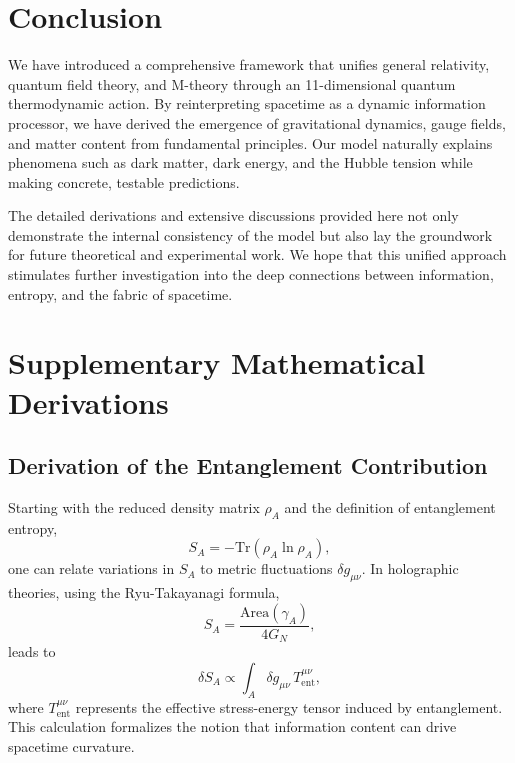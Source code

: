 \documentclass[12pt, a4paper]{article}
\begin{document}
\section{Conclusion}
We have introduced a comprehensive framework that unifies general relativity, quantum field theory, and M-theory through an 11-dimensional quantum thermodynamic action. By reinterpreting spacetime as a dynamic information processor, we have derived the emergence of gravitational dynamics, gauge fields, and matter content from fundamental principles. Our model naturally explains phenomena such as dark matter, dark energy, and the Hubble tension while making concrete, testable predictions.

The detailed derivations and extensive discussions provided here not only demonstrate the internal consistency of the model but also lay the groundwork for future theoretical and experimental work. We hope that this unified approach stimulates further investigation into the deep connections between information, entropy, and the fabric of spacetime.

\appendix

\section{Supplementary Mathematical Derivations}
\subsection{Derivation of the Entanglement Contribution}
Starting with the reduced density matrix \(\rho_A\) and the definition of entanglement entropy,
\begin{equation}
    S_A = -\text{Tr}(\rho_A \ln \rho_A),
\end{equation}
one can relate variations in \(S_A\) to metric fluctuations \(\delta g_{\mu\nu}\). In holographic theories, using the Ryu-Takayanagi formula,
\begin{equation}
    S_A = \frac{\text{Area}(\gamma_A)}{4G_N},
\end{equation}
leads to
\begin{equation}
    \delta S_A \propto \int_A \delta g_{\mu\nu}\, T^{\mu\nu}_{\text{ent}},
\end{equation}
where \(T^{\mu\nu}_{\text{ent}}\) represents the effective stress-energy tensor induced by entanglement. This calculation formalizes the notion that information content can drive spacetime curvature.
\end{document}
